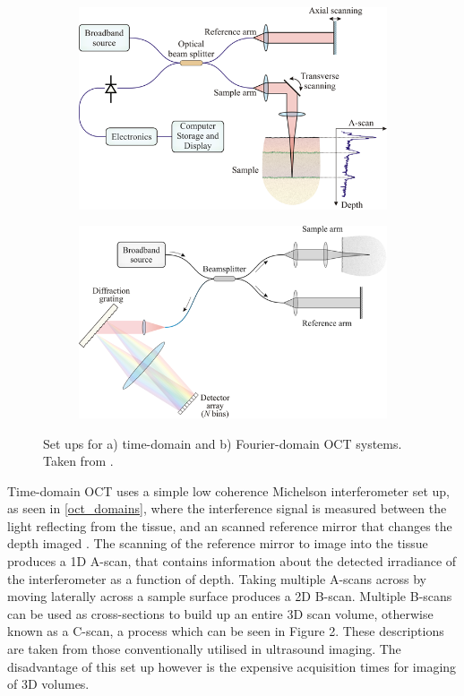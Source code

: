 \begin{figure}
	\centering
    \begin{subfigure}{0.45\textwidth}
    	\centering
        \includegraphics[width=\textwidth]{figures/time_domain}
    \end{subfigure}
    \quad
    \begin{subfigure}{0.45\textwidth}
    	\centering
        \includegraphics[width=\textwidth]{figures/fourier_domain.png}
    \end{subfigure}
    \label{oct_domain}
    \caption{Set ups for a) time-domain and b) Fourier-domain OCT systems. Taken from \cite{optical+biomedical_engineering_laboratory_introduction_nodate}.}
\end{figure}

Time-domain OCT uses a simple low coherence Michelson interferometer set up, as seen in \autoref{oct_domains}, where the interference signal is measured between the light reflecting from the tissue, and an scanned reference mirror that changes the depth imaged \cite{huang_optical_1991}. The scanning of the reference mirror to image into the tissue produces a 1D A-scan, that contains information about the detected irradiance of the interferometer as a function of depth. Taking multiple A-scans across by moving laterally across a sample surface produces a 2D B-scan. Multiple B-scans can be used as cross-sections to build up an entire 3D scan volume, otherwise known as a C-scan, a process which can be seen in Figure 2. These descriptions are taken from those conventionally utilised in ultrasound imaging. The disadvantage of this set up however is the expensive acquisition times for imaging of 3D volumes.

